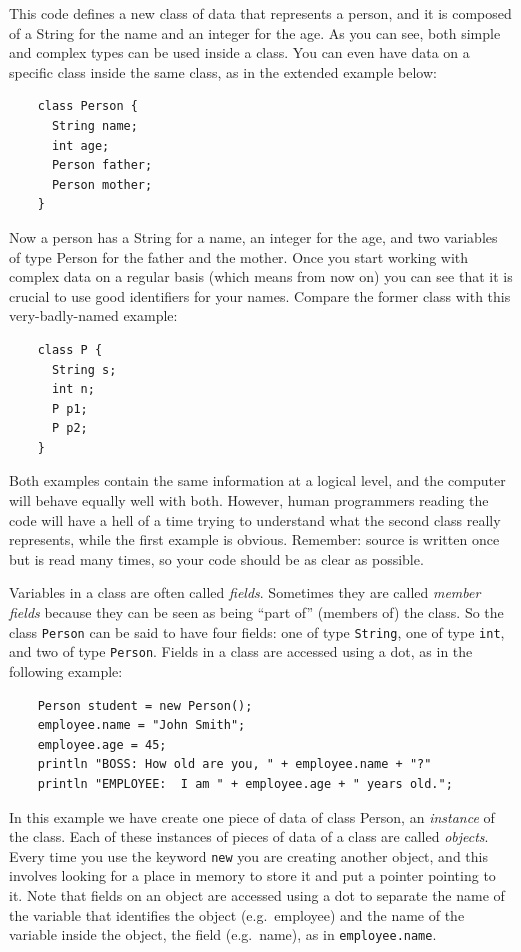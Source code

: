 This code defines a new class of data that represents a person, and
it is composed of a String for the name and an integer for the age. As
you can see, both simple and complex types can be used inside a
class. You can even have data on a specific class inside the same
class, as in the extended example below: 

\begin{verbatim}
    class Person {
      String name;
      int age;
      Person father;
      Person mother;
    }
\end{verbatim}

Now a person has a String for a name, an integer for the age, and two
variables of type Person for the father and the mother. Once you start
working with complex data on a regular basis (which means from now on)
you can see that it is crucial to use good identifiers for your
names. Compare the former class with this very-badly-named example: 

\begin{verbatim}
    class P {
      String s;
      int n;
      P p1;
      P p2;
    }
\end{verbatim}

Both examples contain the same information at a logical level, and the
computer will behave equally well with both. However, human
programmers reading the code will have a hell of a time trying to
understand what the second class really represents, while the first
example is obvious. Remember: source is written once but is read many
times, so your code should be as clear as possible.

Variables in a class are often called \emph{fields}. Sometimes they
are called \emph{member fields} because they can be seen as being
``part of'' (members of) the class. So the class \verb+Person+ can be
said to have four fields: one of type \verb+String+, one of type
\verb+int+, and two of type \verb+Person+. Fields in a class are
accessed using a dot, as in the following example: 

\begin{verbatim}
    Person student = new Person();
    employee.name = "John Smith";
    employee.age = 45;
    println "BOSS: How old are you, " + employee.name + "?"
    println "EMPLOYEE:  I am " + employee.age + " years old.";
\end{verbatim}

In this example we have create one piece of data of class Person, an
\emph{instance} of the class. Each of these instances of pieces of
data of a class are called \emph{objects}. Every time you use the
keyword \verb+new+ you are creating another object, and this involves
looking for a place in memory to store it and put a pointer pointing
to it. Note that fields on an object are accessed using a dot to
separate the name of the variable that identifies the object
(e.g.~employee) and the name of the variable inside the object, the
field (e.g.~name), as in \verb+employee.name+.

